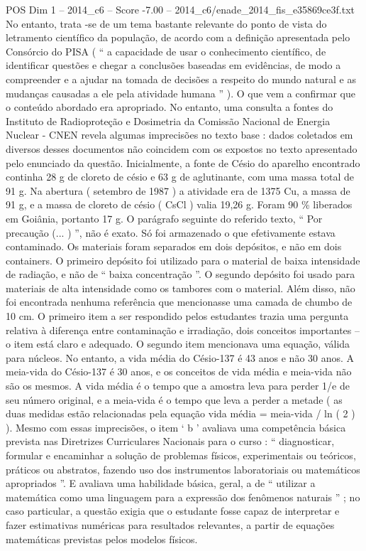 \begin{textsample}{POS Dim 1 – 2014\_c6 – Score -7.00 – 2014\_c6/enade\_2014\_fis\_e35869ce3f.txt}
No entanto, trata -se de um tema bastante relevante do ponto de vista do letramento científico da população, de acordo com a definição apresentada pelo Consórcio do PISA ( “ a capacidade de usar o conhecimento científico, de identificar questões e chegar a conclusões baseadas em evidências, de modo a compreender e a ajudar na tomada de decisões a respeito do mundo natural e as mudanças causadas a ele pela atividade humana ” ).
O que vem a confirmar que o conteúdo abordado era apropriado.
No entanto, uma consulta a fontes do Instituto de Radioproteção e Dosimetria da Comissão Nacional de Energia Nuclear - CNEN revela algumas imprecisões no texto base : dados coletados em diversos desses documentos não coincidem com os expostos no texto apresentado pelo enunciado da questão.
Inicialmente, a fonte de Césio do aparelho encontrado continha 28 g de cloreto de césio e 63 g de aglutinante, com uma massa total de 91 g.
Na abertura ( setembro de 1987 ) a atividade era de 1375 Cu, a massa de 91 g, e a massa de cloreto de césio ( CsCl ) valia 19,26 g.
Foram 90 \% liberados em Goiânia, portanto 17 g.
O parágrafo seguinte do referido texto, “ Por precaução (... ) ”, não é exato.
Só foi armazenado o que efetivamente estava contaminado.
Os materiais foram separados em dois depósitos, e não em dois containers.
O primeiro depósito foi utilizado para o material de baixa intensidade de radiação, e não de “ baixa concentração ”.
O segundo depósito foi usado para materiais de alta intensidade como os tambores com o material.
Além disso, não foi encontrada nenhuma referência que mencionasse uma camada de chumbo de 10 cm.
O primeiro item a ser respondido pelos estudantes trazia uma pergunta relativa à diferença entre contaminação e irradiação, dois conceitos importantes – o item está claro e adequado.
O segundo item mencionava uma equação, válida para núcleos.
No entanto, a vida média do Césio-137 é 43 anos e não 30 anos.
A meia-vida do Césio-137 é 30 anos, e os conceitos de vida média e meia-vida não são os mesmos.
A vida média é o tempo que a amostra leva para perder 1/e de seu número original, e a meia-vida é o tempo que leva a perder a metade ( as duas medidas estão relacionadas pela equação vida média = meia-vida / ln ( 2 ) ).
Mesmo com essas imprecisões, o item ‘ b ’ avaliava uma competência básica prevista nas Diretrizes Curriculares Nacionais para o curso : “ diagnosticar, formular e encaminhar a solução de problemas físicos, experimentais ou teóricos, práticos ou abstratos, fazendo uso dos instrumentos laboratoriais ou matemáticos apropriados ”.
E avaliava uma habilidade básica, geral, a de “ utilizar a matemática como uma linguagem para a expressão dos fenômenos naturais ” ; no caso particular, a questão exigia que o estudante fosse capaz de interpretar e fazer estimativas numéricas para resultados relevantes, a partir de equações matemáticas previstas pelos modelos físicos.

\end{textsample}
